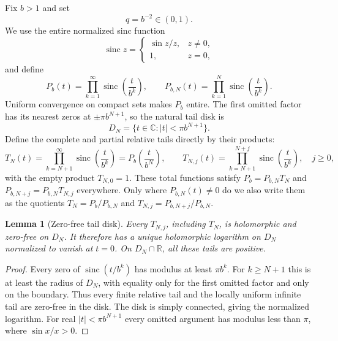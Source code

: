\documentclass[11pt,oneside]{article}
\numberwithin{equation}{section}
\theoremstyle{frontier}
\newtheorem{lemma}[theorem]{Lemma}
\theoremstyle{definition}
\theoremstyle{remark}
\newcommand{\sinc}{\operatorname{sinc}}
\newcommand{\R}{\mathbb R}
\newcommand{\C}{\mathbb C}
\begin{document}
Fix $b>1$ and set
\begin{equation}
 q=b^{-2}\in(0,1).
 \label{eq:qdef}
\end{equation}
We use the entire normalized sinc function
\[
 \sinc z=\begin{cases}\sin z/z,&z\ne0,\\1,&z=0,
 \end{cases}
\]
and define
\begin{equation}
 P_b(t)=\prod_{k=1}^{\infty}\sinc\!\left(\frac{t}{b^k}\right),
 \qquad
 P_{b,N}(t)=\prod_{k=1}^{N}\sinc\!\left(\frac{t}{b^k}\right).
 \label{eq:Pb}
\end{equation}
Uniform convergence on compact sets makes $P_b$ entire.  The first omitted factor has its
nearest zeros at $\pm\pi b^{N+1}$, so the natural tail disk is
\begin{equation}
 D_N=\{t\in\C:|t|<\pi b^{N+1}\}.
 \label{eq:DN}
\end{equation}
Define the complete and partial relative tails directly by their products:
\begin{equation}
 T_N(t)=\prod_{k=N+1}^{\infty}\sinc\!\left(\frac{t}{b^k}\right)
       =P_b\!\left(\frac{t}{b^N}\right),
 \qquad
 T_{N,j}(t)=\prod_{k=N+1}^{N+j}\sinc\!\left(\frac{t}{b^k}\right),\quad j\ge0,
 \label{eq:tails}
\end{equation}
with the empty product $T_{N,0}=1$.  These total functions satisfy
$P_b=P_{b,N}T_N$ and $P_{b,N+j}=P_{b,N}T_{N,j}$ everywhere.  Only where
$P_{b,N}(t)\ne0$ do we also write them as the quotients
$T_N=P_b/P_{b,N}$ and $T_{N,j}=P_{b,N+j}/P_{b,N}$.

\begin{lemma}[Zero-free tail disk]\label{lem:zero-free-tail}
Every $T_{N,j}$, including $T_N$, is holomorphic and zero-free on $D_N$.  It therefore has a
unique holomorphic logarithm on $D_N$ normalized to vanish at $t=0$.  On
$D_N\cap\R$, all these tails are positive.
\end{lemma}

\begin{proof}
Every zero of $\sinc(t/b^k)$ has modulus at least $\pi b^k$.  For $k\ge N+1$
this is at least the radius of $D_N$, with equality only for the first omitted factor and only
on the boundary.  Thus every finite relative tail and the locally uniform infinite tail are
zero-free in the disk.  The disk is simply connected, giving the normalized logarithm.
For real $|t|<\pi b^{N+1}$ every omitted argument has modulus less than $\pi$, where
$\sin x/x>0$.
\end{proof}
\end{document}
